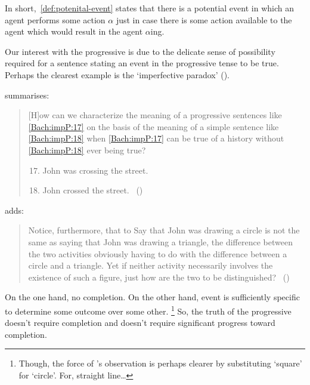 \begin{note}
  In short,~\autoref{def:potenital-event} states that there is a potential event in which an agent performs some action \(\alpha\) just in case there is some action available to the agent which would result in the agent \(\alpha\)ing.
\end{note}

\begin{note}
  Our interest with the progressive is due to the delicate sense of possibility required for a sentence stating an event in the progressive tense to be true.
  Perhaps the clearest example is the `imperfective paradox' (\citeyear[cf.][Ch.3.1]{Dowty:1979vq}).

  \citeauthor{Bach:1986tb} summarises:
  \begin{quote}
    [H]ow can we characterize the meaning of a progressive sentences like \ref{Bach:impP:17} on the basis of the meaning of a simple sentence like \ref{Bach:impP:18} when \ref{Bach:impP:17} can be true of a history without \ref{Bach:impP:18} ever being true?
    \begin{enumerate}[label=(\arabic*), ref=(\arabic*)]
      \setcounter{enumi}{16}
    \item
      \label{Bach:impP:17}
      John was crossing the street.
    \item
      \label{Bach:impP:18}
      John crossed the street.%
      \mbox{ }\hfill\mbox{(\citeyear[12]{Bach:1986tb})}
    \end{enumerate}
  \end{quote}
  \citeauthor{Dowty:1979vq} adds:
  \begin{quote}
    Notice, furthermore, that to Say that John was drawing a circle is not the same as saying that John was drawing a triangle, the difference between the two activities obviously having to do with the difference between a circle and a triangle.
    Yet if neither activity necessarily involves the existence of such a figure, just how are the two to be distinguished?%
    \mbox{ }\hfill\mbox{(\citeyear[133]{Dowty:1979vq})}
  \end{quote}
  On the one hand, no completion.
  On the other hand, event is sufficiently specific to determine some outcome over some other.%
  \footnote{
    Though, the force of \citeauthor{Dowty:1979vq}'s observation is perhaps clearer by substituting `square' for `circle'.
    For, straight line\dots
  }
  So, the truth of the progressive doesn't require completion and doesn't require significant progress toward completion.


\end{note}
